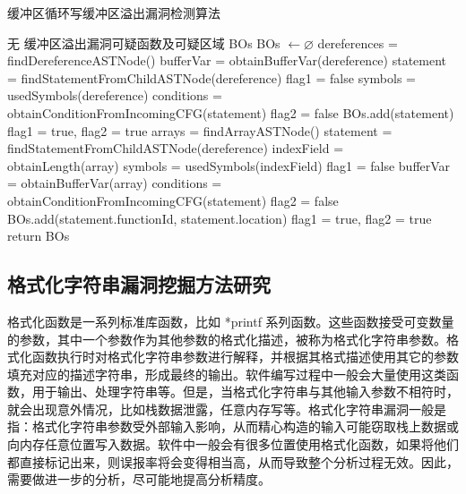 {\begin{breakablealgorithm}
	\label{缓冲区循环写缓冲区溢出漏洞检测算法}
	\caption{缓冲区循环写缓冲区溢出漏洞检测算法}
	\begin{algorithmic}[1]
	\REQUIRE 无
	\ENSURE 缓冲区溢出漏洞可疑函数及可疑区域 BOs
	\STATE BOs $\leftarrow \varnothing$
	\STATE dereferences = findDereferenceASTNode()
		\STATE bufferVar = obtainBufferVar(dereference)
		\STATE statement = findStatementFromChildASTNode(dereference)
				\STATE flag1 = false
			\ENDIF
			\STATE symbols = usedSymbols(dereference)
			\STATE conditions = obtainConditionFromIncomingCFG(statement)
					\STATE flag2 = false
				\ENDIF
			\ENDFOR
				\STATE BOs.add(statement)
			\ENDIF
			\STATE flag1 = true, flag2 = true
		\ENDIF
	\ENDFOR
	\STATE arrays = findArrayASTNode()
		\STATE statement = findStatementFromChildASTNode(dereference)
			\STATE indexField = obtainLength(array)
			\STATE symbols = usedSymbols(indexField)
					\STATE flag1 = false
				\ENDIF
			\ENDFOR
			\STATE bufferVar = obtainBufferVar(array)
			\STATE conditions = obtainConditionFromIncomingCFG(statement)
					\STATE flag2 = false
				\ENDIF
			\ENDFOR
				\STATE BOs.add(statement.functionId, statement.location)
			\ENDIF
			\STATE flag1 = true, flag2 = true
		\ENDIF
	\ENDFOR
	\STATE return BOs	
	\end{algorithmic}
\end{breakablealgorithm}

\subsection{格式化字符串漏洞挖掘方法研究}
格式化函数是一系列标准库函数，比如 *printf 系列函数。这些函数接受可变数量的参数，其中一个参数作为其他参数的格式化描述，被称为格式化字符串参数。格式化函数执行时对格式化字符串参数进行解释，并根据其格式描述使用其它的参数填充对应的描述字符串，形成最终的输出。软件编写过程中一般会大量使用这类函数，用于输出、处理字符串等。但是，当格式化字符串与其他输入参数不相符时，就会出现意外情况，比如栈数据泄露，任意内存写等。格式化字符串漏洞一般是指：格式化字符串参数受外部输入影响，从而精心构造的输入可能窃取栈上数据或向内存任意位置写入数据。软件中一般会有很多位置使用格式化函数，如果将他们都直接标记出来，则误报率将会变得相当高，从而导致整个分析过程无效。因此，需要做进一步的分析，尽可能地提高分析精度。

}
